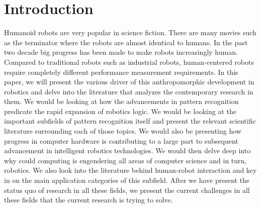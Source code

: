 \documentclass[conference]{IEEEtran}
\begin{document}
\section{Introduction}
Humanoid robots are very popular in science fiction. There are many movies such as the terminator where the robots are almost identical to humans. In the past two decade big progress has been made to make robots increasingly human. Compared to traditional robots such as industrial robots, human-centered robots require completely different performance measurement requirements\autocite{zinn2004new}. In this paper, we will present the various driver of this anthropomorphic development in robotics and delve into the literature that analyzes the contemporary research in them. We would be looking at how the advancements in pattern recognition predicate the rapid expansion of robotics logic. We would be looking at the important subfields of pattern recognition itself and present the relevant scientific literature surrounding each of those topics. We would also be presenting how progress in computer hardware is contributing to a large part to subsequent advancement in intelligent robotics technologies. We would then delve deep into why could computing is engendering all areas of computer science and in turn, robotics. We also look into the literature behind human-robot interaction and key in on the main application categories of this subfield. After we have present the status quo of research in all these fields, we present the current challenges in all these fields that the current research is trying to solve.
\end{document}
